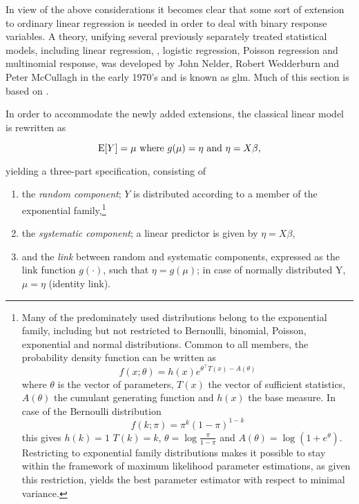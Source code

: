 In view of the above considerations it becomes clear that some sort of extension to ordinary linear regression is needed in order to deal with binary response variables. A theory, unifying several previously separately treated statistical models, including linear regression, , logistic regression, Poisson regression and multinomial response, was developed by John Nelder, Robert Wedderburn and Peter McCullagh in the early 1970's \citep{Nelder1972,McCullagh1989} and is known as \acrfull{glm}. Much of this section is based on \citep{McCullagh1989}.

In order to accommodate the newly added extensions, the classical linear model is rewritten as

\begin{equation}
  \operatorname{\mathrm{E}}[Y] = \mu \text{ where } g(\mu) = \eta \text{ and } \eta = X \beta,
\end{equation}

yielding a three-part specification, consisting of

\begin{enumerate}[label=(\alph*)]
  \item the \textit{random component}; $Y$ is distributed according to a member of the exponential family,\footnote{Many of the predominately used distributions belong to the exponential family, including but not restricted to Bernoulli, binomial, Poisson, exponential and normal distributions. Common to all members, the probability density function can be written as
  \begin{equation}
    f(x;\theta) = h(x) e^{\theta^\intercal T(x)-A(\theta)}
  \end{equation}
  where $\theta$ is the vector of parameters, $T(x)$ the vector of sufficient statistics, $A(\theta)$ the cumulant generating function and $h(x)$ the base measure. In case of the Bernoulli distribution
  \begin{equation}
    f(k;\pi) = \pi^k (1-\pi)^{1-k}\label{eq:bern-pmf}
  \end{equation}
  this gives $h(k) = 1$ $T(k) = k$, $\theta = \log\frac{\pi}{1-\pi}$ and $A(\theta) = \log(1+e^\theta)$. Restricting  to exponential family distributions makes it possible to stay within the framework of maximum likelihood parameter estimations, as given this restriction,  yields the best parameter estimator with respect to minimal variance.}
  \item the \textit{systematic component}; a linear predictor is given by $\eta = X\beta$,
  \item and the \textit{link} between random and systematic components, expressed as the link function $g(\cdot)$, such that $\eta = g(\mu)$; in case of normally distributed Y, $\mu = \eta$ (identity link).
\end{enumerate}


